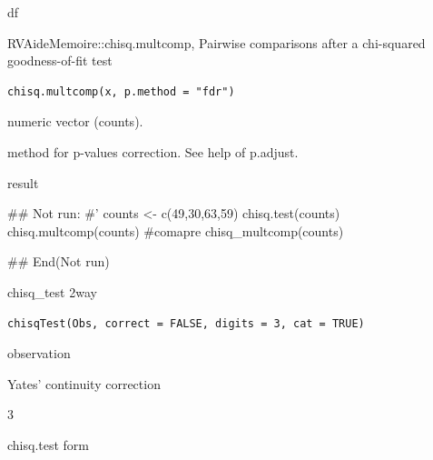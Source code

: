 \documentclass[a4paper]{book}
\begin{document}
%
\begin{Value}
df
\end{Value}
%
\begin{Description}
RVAideMemoire::chisq.multcomp, Pairwise comparisons after a chi-squared goodness-of-fit test
\end{Description}
%
\begin{Usage}
\begin{verbatim}
chisq.multcomp(x, p.method = "fdr")
\end{verbatim}
\end{Usage}
%
\begin{Arguments}
\begin{ldescription}
\item[\code{x}] numeric vector (counts).

\item[\code{p.method}] method for p-values correction. See help of p.adjust.
\end{ldescription}
\end{Arguments}
%
\begin{Value}
result
\end{Value}
%
\begin{Examples}
\begin{ExampleCode}

## Not run: 
#'
counts <- c(49,30,63,59)
chisq.test(counts)
chisq.multcomp(counts)
#comapre
chisq_multcomp(counts)


## End(Not run)
\end{ExampleCode}
\end{Examples}
%
\begin{Description}
chisq\_test 2way
\end{Description}
%
\begin{Usage}
\begin{verbatim}
chisqTest(Obs, correct = FALSE, digits = 3, cat = TRUE)
\end{verbatim}
\end{Usage}
%
\begin{Arguments}
\begin{ldescription}
\item[\code{Obs}] observation

\item[\code{correct}] Yates' continuity correction

\item[\code{digits}] 3

\item[\code{cat}] chisq.test form
\end{ldescription}
\end{Arguments}
\end{document}

